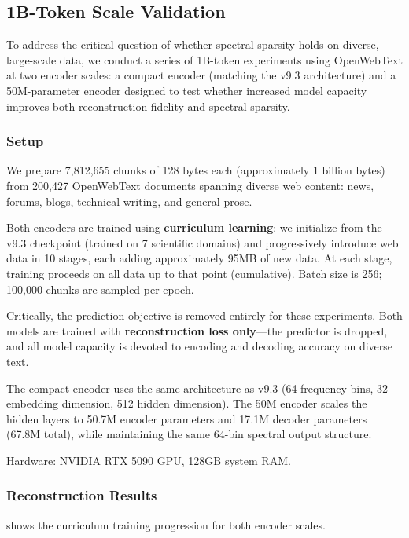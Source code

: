 \documentclass[10pt,twocolumn]{article}
\begin{document}
\subsection{1B-Token Scale Validation}

To address the critical question of whether spectral sparsity holds on diverse, large-scale data, we conduct a series of 1B-token experiments using OpenWebText at two encoder scales: a compact encoder (matching the v9.3 architecture) and a 50M-parameter encoder designed to test whether increased model capacity improves both reconstruction fidelity and spectral sparsity.

\subsubsection{Setup}

We prepare 7,812,655 chunks of 128 bytes each (approximately 1 billion bytes) from 200,427 OpenWebText documents spanning diverse web content: news, forums, blogs, technical writing, and general prose.

Both encoders are trained using \textbf{curriculum learning}: we initialize from the v9.3 checkpoint (trained on 7 scientific domains) and progressively introduce web data in 10 stages, each adding approximately 95MB of new data. At each stage, training proceeds on all data up to that point (cumulative). Batch size is 256; 100,000 chunks are sampled per epoch.

Critically, the prediction objective is removed entirely for these experiments. Both models are trained with \textbf{reconstruction loss only}---the predictor is dropped, and all model capacity is devoted to encoding and decoding accuracy on diverse text.

The compact encoder uses the same architecture as v9.3 (64 frequency bins, 32 embedding dimension, 512 hidden dimension). The 50M encoder scales the hidden layers to 50.7M encoder parameters and 17.1M decoder parameters (67.8M total), while maintaining the same 64-bin spectral output structure.

Hardware: NVIDIA RTX 5090 GPU, 128GB system RAM.

\subsubsection{Reconstruction Results}

 shows the curriculum training progression for both encoder scales.
\end{document}
